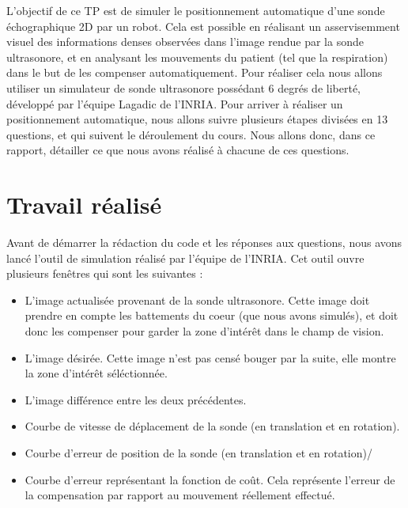 \documentclass[a4paper,11pt]{article}
\begin{document}
L'objectif de ce TP est de simuler le positionnement automatique d'une sonde \'echographique 2D par un robot. Cela est possible en r\'ealisant un asservisemment visuel des informations denses observ\'ees dans l'image rendue par la sonde ultrasonore, et en analysant les mouvements du patient (tel que la respiration) dans le but de les compenser automatiquement.
Pour r\'ealiser cela nous allons utiliser un simulateur de sonde ultrasonore poss\'edant 6 degr\'es de libert\'e, d\'evelopp\'e par l'\'equipe Lagadic de l'INRIA. Pour arriver \`a r\'ealiser un positionnement automatique, nous allons suivre plusieurs \'etapes divis\'ees en 13 questions, et qui suivent le d\'eroulement du cours. Nous allons donc, dans ce rapport, d\'etailler ce que nous avons r\'ealis\'e \`a chacune de ces questions.


\section{Travail r\'ealis\'e}
Avant de d\'emarrer la r\'edaction du code et les r\'eponses aux questions, nous avons lanc\'e l'outil de simulation r\'ealis\'e par l'\'equipe de l'INRIA. Cet outil ouvre plusieurs fen\^etres qui sont les suivantes :
\begin{itemize}
\item L'image actualis\'ee provenant de la sonde ultrasonore. Cette image doit prendre en compte les battements du coeur (que nous avons simul\'es), et doit donc les compenser pour garder la zone d'int\'er\^et dans le champ de vision.
\item L'image d\'esir\'ee. Cette image n'est pas cens\'e bouger par la suite, elle montre la zone d'int\'er\^et s\'el\'ectionn\'ee.
\item L'image diff\'erence entre les deux pr\'ec\'edentes.
\item Courbe de vitesse de d\'eplacement de la sonde (en translation et en rotation).
\item Courbe d'erreur de position de la sonde (en translation et en rotation)/
\item Courbe d'erreur repr\'esentant la fonction de co\^ut. Cela repr\'esente l'erreur de la compensation par rapport au mouvement r\'eellement effectu\'e.
\end{itemize}
\end{document}
